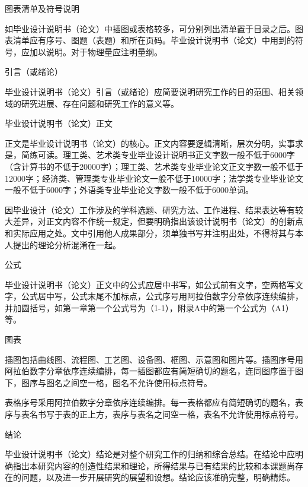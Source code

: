 \documentclass{imutthesis}
\begin{document}
\begin{enumerate}
{\bfseries	\item 图表清单及符号说明}
\par\qquad 如毕业设计说明书（论文）中插图或表格较多，可分别列出清单置于目录之后。图表清单应有序号、图题（表题）和所在页码。毕业设计说明书（论文）中用到的符号，应加以说明。对于物理量应注明量纲。

{\bfseries	\item 引言（或绪论）}
\par\qquad 毕业设计说明书（论文）引言（或绪论）应简要说明研究工作的目的范围、相关领域的研究进展、存在问题和研究工作的意义等。

{\bfseries	\item  毕业设计说明书（论文）正文}
\par\qquad 正文是毕业设计说明书（论文）的核心。正文内容要逻辑清晰，层次分明，实事求是，简练可读。理工类、艺术类专业毕业设计说明书正文字数一般不低于6000字（含计算书的不低于20000字）；理工类、艺术类专业毕业论文正文字数一般不低于12000字；经济类、管理类专业毕业论文一般不低于10000字；法学类专业毕业论文一般不低于6000字；外语类专业毕业论文字数一般不低于6000单词。

\qquad 因毕业设计（论文）工作涉及的学科选题、研究方法、工作进程、结果表达等有较大差异，对正文内容不作统一规定，但要明确指出该设计说明书（论文）的创新点和实际应用之处。文中引用他人成果部分，须单独书写并注明出处，不得将其与本人提出的理论分析混淆在一起。

{\bfseries	\item 公式}
\par\qquad 毕业设计说明书（论文）正文中的公式应居中书写，如公式前有文字，空两格写文字，公式居中写，公式末尾不加标点，公式序号用阿拉伯数字分章依序连续编排，并加圆括号，如第一章第一个公式号为（1-1），附录A中的第一个公式为（A1）等。

{\bfseries	\item 图表}
\par\qquad 插图包括曲线图、流程图、工艺图、设备图、框图、示意图和图片等。插图序号用阿拉伯数字分章依序连续编排，每一插图都应有简短确切的题名，连同图序置于图下，图序与图名之间空一格，图名不允许使用标点符号。

\qquad 表格序号采用阿拉伯数字分章依序连续编排。每一表格都应有简短确切的题名，表序与表名书写于表的正上方，表序与表名之间空一格，表名不允许使用标点符号。

{\bfseries	\item 结论}
\par\qquad 毕业设计说明书（论文）结论是对整个研究工作的归纳和综合总结。在结论中应明确指出本研究内容的创造性结果和理论，所得结果与已有结果的比较和本课题尚存在的问题，以及进一步开展研究的展望和设想。结论应该准确完整，明确精炼。


\end{enumerate}
\end{document}
